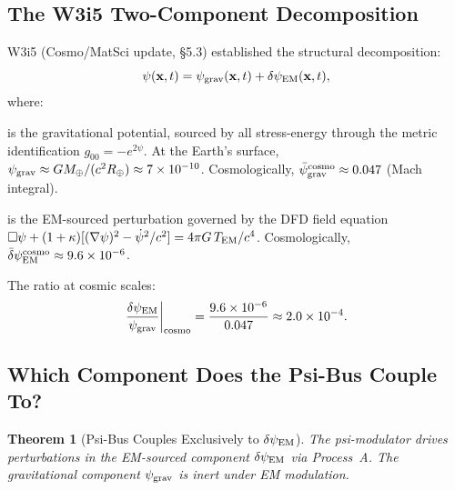 \documentclass[11pt]{article}
\newtheorem{theorem}{Theorem}[section]
\theoremstyle{definition}
\theoremstyle{remark}
\newcommand{\ee}[1]{\times 10^{#1}}
\newcommand{\psigrav}{\psi_{\rm grav}}
\newcommand{\dpsiEM}{\delta\psi_{\rm EM}}
\begin{document}
\subsection{The W3i5 Two-Component Decomposition}
\label{sec:decomposition-recap}

W3i5 (Cosmo/MatSci update, \S5.3) established the structural decomposition:
\begin{equation}
  \psi(\mathbf{x}, t) = \psigrav(\mathbf{x}, t) + \dpsiEM(\mathbf{x}, t),
  \label{eq:two-component}
\end{equation}
where:
\begin{description}[leftmargin=2em]
  \item[$\psigrav$] is the gravitational potential, sourced by all
    stress-energy through the metric identification $g_{00} = -e^{2\psi}$.
    At the Earth's surface, $\psigrav \approx GM_\oplus/(c^2 R_\oplus)
    \approx 7\ee{-10}$.  Cosmologically,
    $\bar\psi_{\rm grav}^{\rm cosmo} \approx 0.047$ (Mach integral).
  \item[$\dpsiEM$] is the EM-sourced perturbation governed by the DFD
    field equation $\Box\psi + (1+\kappa)[(\nabla\psi)^2 - \dot\psi^2/c^2]
    = 4\pi G\,T_{\rm EM}/c^4$.  Cosmologically,
    $\bar\delta\psi_{\rm EM}^{\rm cosmo} \approx 9.6\ee{-6}$.
\end{description}

The ratio at cosmic scales:
\begin{equation}
  \frac{\dpsiEM}{\psigrav}\bigg|_{\rm cosmo} = \frac{9.6\ee{-6}}{0.047}
  \approx 2.0\ee{-4}.
  \label{eq:ratio-cosmo}
\end{equation}

\subsection{Which Component Does the Psi-Bus Couple To?}
\label{sec:which-component}

\begin{theorem}[Psi-Bus Couples Exclusively to $\dpsiEM$]
\label{thm:psi-bus-em-only}
The psi-modulator drives perturbations in the EM-sourced component
$\dpsiEM$ via Process~A. The gravitational component $\psigrav$ is
inert under EM modulation.
\end{theorem}
\end{document}
